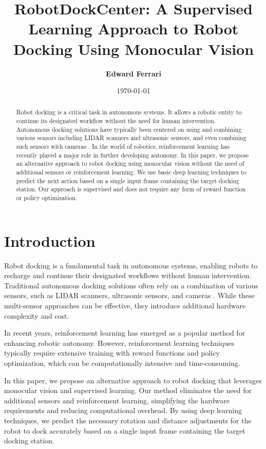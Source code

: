\documentclass{article}
\begin{document}
\title{\textbf{RobotDockCenter: A Supervised Learning Approach to Robot Docking Using Monocular Vision}}
\author{\textbf{Edward Ferrari}}
\date{\today}

\maketitle

\begin{abstract}
Robot docking is a critical task in autonomous systems. 
It allows a robotic entity to continue its designated workflow without the need for human intervention. 
Autonomous docking solutions have typically been centered on using and combining various sensors including LIDAR scanners and ultrasonic sensors, and even combining such sensors with cameras \citep{app131910675}. 
In the world of robotics, reinforcement learning has recently played a major role in further developing autonomy. 
In this paper, we propose an alternative approach to robot docking using monocular vision without the need of additional sensors or reinforcement learning. 
We use basic deep learning techniques to predict the next action based on a single input frame containing the target docking station.
Our approach is supervised and does not require any form of reward function or policy optimization.
\end{abstract}

\section{Introduction}
Robot docking is a fundamental task in autonomous systems, enabling robots to recharge and continue their designated workflows without human intervention. Traditional autonomous docking solutions often rely on a combination of various sensors, such as LIDAR scanners, ultrasonic sensors, and cameras \citep{app131910675}. While these multi-sensor approaches can be effective, they introduce additional hardware complexity and cost.

In recent years, reinforcement learning has emerged as a popular method for enhancing robotic autonomy. However, reinforcement learning techniques typically require extensive training with reward functions and policy optimization, which can be computationally intensive and time-consuming.

In this paper, we propose an alternative approach to robot docking that leverages monocular vision and supervised learning. Our method eliminates the need for additional sensors and reinforcement learning, simplifying the hardware requirements and reducing computational overhead. By using deep learning techniques, we predict the necessary rotation and distance adjustments for the robot to dock accurately based on a single input frame containing the target docking station.
\end{document}
